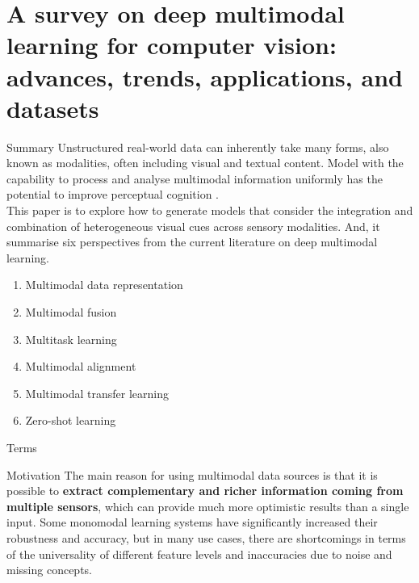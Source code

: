 \documentclass[aspectratio=169]{beamer}
\begin{document}

\section{A survey on deep multimodal learning for computer vision: advances,
  trends, applications, and datasets}
\begin{frame}{Summary}
    Unstructured real-world data can inherently take many forms, also known as
    modalities, often including visual and textual content. Model with the
    capability to process and analyse multimodal information uniformly has the
    potential to improve perceptual cognition . \\
    This paper is to explore how to generate models that consider the
    integration and combination of heterogeneous visual cues across sensory
    modalities. And, it summarise six perspectives from the current literature
    on
    deep multimodal learning.\\
    \begin{multicols}{2}
        \begin{enumerate}
            \item Multimodal data representation
            \item Multimodal fusion
            \item Multitask learning
            \item Multimodal alignment
            \item Multimodal transfer learning
            \item Zero-shot learning
        \end{enumerate}
    \end{multicols}
\end{frame}

\begin{frame}{Terms}
\end{frame}

\begin{frame}{Motivation}
    The main reason for using multimodal data sources is that it is possible to
    \textbf{extract complementary and richer information coming from multiple
        sensors}, which can provide much more optimistic results than a single
    input.
    Some monomodal learning systems have significantly increased their
    robustness
    and accuracy, but in many use cases, there are shortcomings in terms of the
    universality of different feature levels and inaccuracies due to noise and
    missing concepts.
\end{frame}
\end{document}
